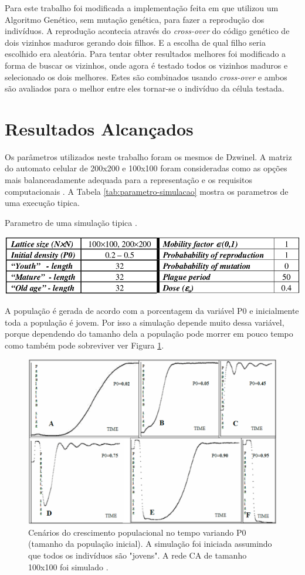 \documentclass[12pt]{article}
\begin{document}
Para este trabalho foi modificada a implementação feita em \cite{dzwinel:04}
que utilizou um Algoritmo Genético, sem mutação genética, para fazer a 
reprodução dos indivíduos. A reprodução acontecia através do
\textit{cross-over} do código genético de dois vizinhos maduros gerando dois
filhos. E a escolha de qual filho seria escolhido era aleatória. Para
tentar obter resultados melhores foi modificado a forma de buscar os vizinhos,
onde agora é testado todos os vizinhos maduros e selecionado os dois melhores.
Estes são combinados usando \textit{cross-over} e ambos são avaliados para
o melhor entre eles tornar-se o indivíduo da célula testada. 


\section{Resultados Alcançados}

Os parâmetros utilizados neste trabalho foram os mesmos de Dzwinel.
A matriz do automato celular de 200x200	e 100x100 foram consideradas como
as opções mais balanceadamente adequada para a representação e os requisitos
computacionais \cite{dzwinel:04}. A Tabela \ref{tab:parametro-simulacao}
mostra os parametros de uma execução tipica.

\begin{table}[ht]
\centering
\caption{Parametro de uma simulação tipica \cite{dzwinel:04}.}
\label{tab:parametro-simulacao}
\includegraphics[width=.7\textwidth]{imagens/parametro-simulacao}
\end{table}

A população é gerada de acordo com a porcentagem da variável P0 e inicialmente
toda a população é jovem. Por isso a simulação depende muito dessa variável,
porque dependendo do tamanho dela a população pode morrer em pouco tempo como
também pode sobreviver ver Figura \ref{fig:crescimento-populacao-no-tempo}.

\begin{figure}[h!]
\centering
\includegraphics[width=.5\textwidth]{imagens/crescimento-populacao-no-tempo}
\caption{Cenários do crescimento populacional no tempo variando P0 (tamanho 
da população inicial). A simulação foi iniciada assumindo que todos os 
indivíduos são "jovens". A rede CA de tamanho 100x100 foi simulado 
\cite{dzwinel:04}.}
\label{fig:crescimento-populacao-no-tempo}
\end{figure}
\end{document}
